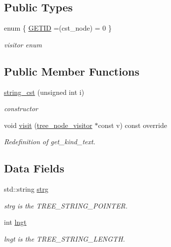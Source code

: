 \subsection*{Public Types}
\begin{DoxyCompactItemize}
\item 
enum \{ \hyperlink{structstring__cst_a72d3d2ed69fd793869b45df063270634af4049bb81f8f63c92d9a1bc914f6debf}{G\+E\+T\+ID} =(cst\+\_\+node) = 0
 \}\begin{DoxyCompactList}\small\item\em visitor enum \end{DoxyCompactList}
\end{DoxyCompactItemize}
\subsection*{Public Member Functions}
\begin{DoxyCompactItemize}
\item 
\hyperlink{structstring__cst_ace745118d10298bc90d2531dfdf34eee}{string\+\_\+cst} (unsigned int i)
\begin{DoxyCompactList}\small\item\em constructor \end{DoxyCompactList}\item 
void \hyperlink{structstring__cst_a45a7b808005d8535d6cdf939d6ac2fa5}{visit} (\hyperlink{classtree__node__visitor}{tree\+\_\+node\+\_\+visitor} $\ast$const v) const override
\begin{DoxyCompactList}\small\item\em Redefinition of get\+\_\+kind\+\_\+text. \end{DoxyCompactList}\end{DoxyCompactItemize}
\subsection*{Data Fields}
\begin{DoxyCompactItemize}
\item 
std\+::string \hyperlink{structstring__cst_a37658ad0410eb26cfedc62903e324036}{strg}
\begin{DoxyCompactList}\small\item\em strg is the T\+R\+E\+E\+\_\+\+S\+T\+R\+I\+N\+G\+\_\+\+P\+O\+I\+N\+T\+ER. \end{DoxyCompactList}\item 
int \hyperlink{structstring__cst_a4a9072c1a97910d10bf3912a12ae4fe9}{lngt}
\begin{DoxyCompactList}\small\item\em lngt is the T\+R\+E\+E\+\_\+\+S\+T\+R\+I\+N\+G\+\_\+\+L\+E\+N\+G\+TH. \end{DoxyCompactList}\end{DoxyCompactItemize}
